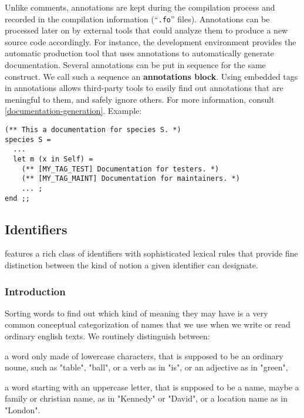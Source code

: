 Unlike comments, annotations are kept during the compilation process
and recorded in the compilation information (``{\tt .fo}'' files). Annotations can
be processed later on by external tools that could analyze them to
produce a new {\focal} source code accordingly.
For instance, the {\focal} development environment provides the {\focdoc}
automatic production tool that uses annotations to automatically generate
documentation.
Several annotations can be put in sequence for the same construct. We call
such a sequence an {\bf annotations block}.
Using embedded tags in annotations allows third-party tools to easily find
out annotations that are meningful to them, and safely ignore others.
For more information, consult
\ref{documentation-generation}.
Example:
{\scriptsize
\begin{lstlisting}
(** This a documentation for species S. *)
species S =
  ...
  let m (x in Self) =
    (** [MY_TAG_TEST] Documentation for testers. *)
    (** [MY_TAG_MAINT] Documentation for maintainers. *)
    ... ;
end ;;
\end{lstlisting}
}

\subsection{Identifiers}
\vspace{0.2cm}

{\focal} features a rich class of identifiers with sophisticated lexical
rules that provide fine distinction between the kind of notion a given
identifier can designate.

\subsubsection{Introduction}

Sorting words to find out which kind of meaning they may have is a very common
conceptual categorization of names that we use when we write or read ordinary
english texts. We routinely distinguish between:
\begin{citemize}
\item a word only made of lowercase characters, that is supposed to be an
  ordinary noune, such as "table", "ball", or a verb as in "is", or an
  adjective as in "green",
\item a word starting with an uppercase letter, that is supposed to be a name,
  maybe a family or christian name, as in "Kennedy" or "David", or a location
  name as in "London".
\end{citemize}

